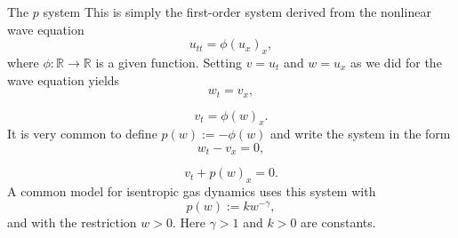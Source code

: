 \begin{Example}{The $p$ system}
\label{ex:p-system}
This is simply the first-order system derived from the nonlinear wave equation
\[
u_{tt}=\phi(u_x)_x,
\]
where $\phi:\mathbb{R}\to\mathbb{R}$ is a given function. Setting $v=u_t$ and $w=u_x$ as we did for the wave equation yields
\begin{equation}\label{eq:nonlinear-wave-first-order-w}
w_t=v_x,
\end{equation}

\begin{equation}\label{eq:nonlinear-wave-first-order-v}
v_t=\phi(w)_x.
\end{equation}
It is very common to define $p(w):=-\phi(w)$ and write the system in the form
\begin{equation}\label{eq:p-system-volume}
w_t-v_x=0,
\end{equation}

\begin{equation}\label{eq:p-system-velocity}
v_t+p(w)_x=0.
\end{equation}
A common model for isentropic gas dynamics uses this system with
\begin{equation}\label{eq:isentropic-pressure-law}
p(w):=kw^{-\gamma},
\end{equation}
and with the restriction $w>0$. Here $\gamma>1$ and $k>0$ are constants.
\end{Example}

